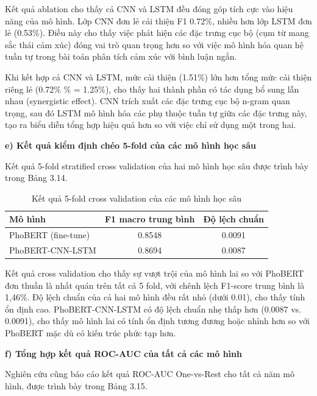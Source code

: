 \documentclass[14pt, a4paper]{report}
\begin{document}
Kết quả ablation cho thấy cả CNN và LSTM đều đóng góp tích cực vào hiệu năng của mô hình. Lớp CNN đơn lẻ cải thiện F1 0.72\%, nhiều hơn lớp LSTM đơn lẻ (0.53\%). Điều này cho thấy việc phát hiện các đặc trưng cục bộ (cụm từ mang sắc thái cảm xúc) đóng vai trò quan trọng hơn so với việc mô hình hóa quan hệ tuần tự trong bài toán phân tích cảm xúc với bình luận ngắn.


Khi kết hợp cả CNN và LSTM, mức cải thiện (1.51\%) lớn hơn tổng mức cải thiện riêng lẻ (0.72\% \% = 1.25\%), cho thấy hai thành phần có tác dụng bổ sung lẫn nhau (synergistic effect). CNN trích xuất các đặc trưng cục bộ n-gram quan trọng, sau đó LSTM mô hình hóa các phụ thuộc tuần tự giữa các đặc trưng này, tạo ra biểu diễn tổng hợp hiệu quả hơn so với việc chỉ sử dụng một trong hai.


\textbf{e) Kết quả kiểm định chéo 5-fold của các mô hình học sâu}


Kết quả 5-fold stratified cross validation của hai mô hình học sâu được trình bày trong Bảng 3.14.


\begin{table}[h]
\centering
\caption{Kết quả 5-fold cross validation của các mô hình học sâu}
\begin{tabular}{|l|c|c|}
\hline
\textbf{Mô hình} & \textbf{F1 macro trung bình} & \textbf{Độ lệch chuẩn} \\
\hline
PhoBERT (fine-tune) & 0.8548 & 0.0091 \\
\hline
PhoBERT-CNN-LSTM & 0.8694 & 0.0087 \\
\hline
\end{tabular}
\end{table}




Kết quả cross validation cho thấy sự vượt trội của mô hình lai so với PhoBERT đơn thuần là nhất quán trên tất cả 5 fold, với chênh lệch F1-score trung bình là 1,46\%. Độ lệch chuẩn của cả hai mô hình đều rất nhỏ (dưới 0.01), cho thấy tính ổn định cao. PhoBERT-CNN-LSTM có độ lệch chuẩn nhẹ thấp hơn (0.0087 vs. 0.0091), cho thấy mô hình lai có tính ổn định tương đương hoặc nhỉnh hơn so với PhoBERT mặc dù có kiến trúc phức tạp hơn.


\textbf{f) Tổng hợp kết quả ROC-AUC của tất cả các mô hình}


Nghiên cứu cũng báo cáo kết quả ROC-AUC One-vs-Rest cho tất cả năm mô hình, được trình bày trong Bảng 3.15.
\end{document}
